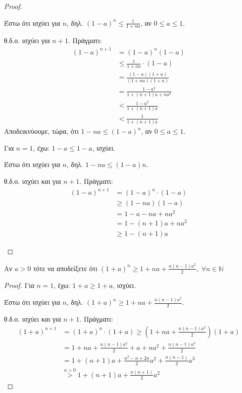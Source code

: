 \begin{multicols}{2}
\begin{enumerate}
\begin{proof}
\begin{enumerate}
          Έστω ότι ισχύει για $n$, δηλ. $ (1-a)^{n} \leq
          \frac{1}{1+na} $, αν $ 0 \leq a \leq 1 $.

          θ.δ.ο. ισχύει για $ n+1 $. Πράγματι: 
          \begin{align*}
            (1-a)^{n+1} &= (1-a)^{n}(1-a) \\
                        &\leq \frac{1}{1+na} \cdot (1-a) \\
                        &= \frac{(1-a)(1+a)}{(1+na)(1+a)} \\
                        &= \frac{1-a^{2}}{1+(n+1)a +na^{2}} \\
                        &< \frac{1-a^{2}}{1 + (n+1)a} \\
                        &< \frac{1}{1 + (n+1)a} 
          \end{align*}
          Αποδεικνύουμε, τώρα, ότι $ 1-na \leq (1-a)^{n} $, αν 
          $ 0 \leq a \leq 1 $. 

          Για $ n=1 $, έχω: $ 1-a \leq 1-a $, ισχύει.

          Έστω ότι ισχύει για $n$, δηλ. $ 1-na \leq (1-a){n} $.

          θ.δ.ο. ισχύει και για $ n+1 $. Πράγματι:
          \begin{align*}
            (1-a)^{n+1}&=(1-a)^{n}\cdot (1-a) \\
                       &\geq (1-na)(1-a) \\
                       &=1-a-na+na^{2} \\
                       &= 1-(n+1)a + na^{2} \\
                       &\geq 1-(n+1)a
          \end{align*}
      \end{enumerate}
    \end{proof}

  \item \textcolor{Col1}{Αν $a > 0$ τότε να αποδείξετε ότι $ (1+a)^{n} 
    \geq 1 + na + \frac{n(n-1)a^{2}}{2},\; \forall n \in \mathbb{N}$}
    \begin{proof}
    \item {}
      Για $ n=1 $, έχω: $ 1+a \geq 1+a $, ισχύει.

      Έστω ότι ισχύει για $n$, δηλ. $ (1+a)^{n} \geq 1+na +
      \frac{n(n-1)a^{2}}{2} $.

      θ.δ.ο. ισχύει και για $ n+1 $. Πράγματι:
      \begin{align*}
        (1+a)^{n+1} &= (1+a)^{n}\cdot (1+a) \geq (1+na+ 
        \frac{n(n-1)a^{2}}{2})(1+a) \\
                    &= 1+na+ \frac{n(n-1)a^{2}}{2} + a + na^{2} + 
                    \frac{n(n-1)a^{3}}{2} \\
                    &= 1+(n+1)a+ \frac{n^{2}-n+2n}{2} a^{2} + 
                    \frac{n(n-1)}{2} a^{3} \\
                    &\overset{a>0}{>} 1+(n+1)a + \frac{n(n+1)}{2} a^{2}
      \end{align*}
    \end{proof}


\end{enumerate}
\end{multicols}
